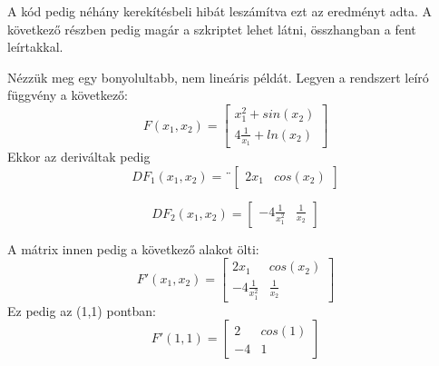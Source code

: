 \documentclass{article}
\theoremstyle{definition}
\theoremstyle{theorem}
\begin{document}
A kód pedig néhány kerekítésbeli hibát leszámítva ezt az eredményt adta. A következő részben pedig magár a szkriptet lehet látni, összhangban a fent leírtakkal.

Nézzük meg egy bonyolultabb, nem lineáris példát. Legyen a rendszert leíró függvény a következő:
\begin{equation*}
    F(x_1,x_2) =
    \begin{bmatrix}
        x_1 ^ 2 + sin(x_2) \\
        4 \frac{1}{x_1} + ln(x_2)
    \end{bmatrix}
\end{equation*}
Ekkor az deriváltak pedig
\begin{equation*}
    D F_1 (x_1, x_2) = ¨\begin{bmatrix}
        2 x_1 & cos(x_2)
    \end{bmatrix}
\end{equation*}

\begin{equation*}
    D F_2 (x_1,x_2) = \begin{bmatrix}
        - 4 \frac{1}{x_1 ^ 2} & \frac{1}{x_2}
    \end{bmatrix}
\end{equation*}

A mátrix innen pedig a következő alakot ölti:
\begin{equation*}
    F'(x_1,x_2) =
    \begin{bmatrix}
        2 x_1 & cos(x_2) \\
        - 4 \frac{1}{x_1 ^ 2} & \frac{1}{x_2}
    \end{bmatrix}
\end{equation*}
Ez pedig az (1,1) pontban:
\begin{equation*}
    F'(1,1) = \begin{bmatrix}
        2 & cos(1) \\
        -4 & 1
    \end{bmatrix}
\end{equation*}
\end{document}
